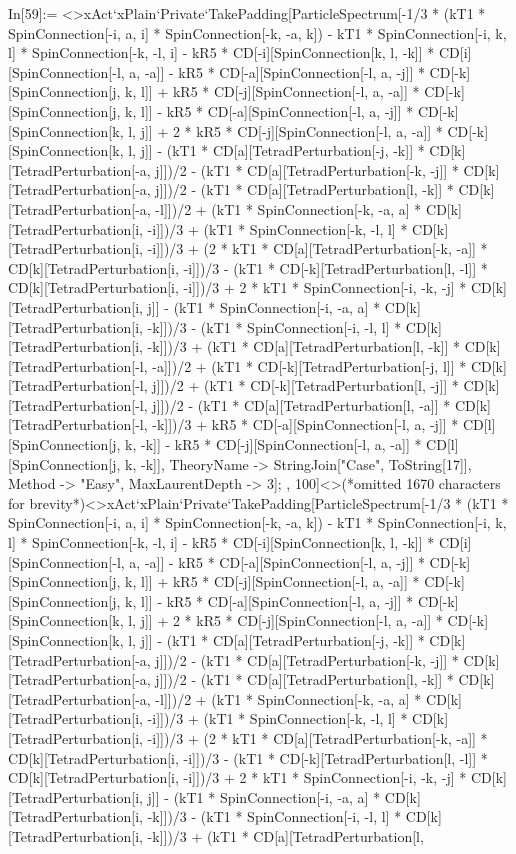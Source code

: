 In[59]:= <>xAct`xPlain`Private`TakePadding[ParticleSpectrum[-1/3 * (kT1 * SpinConnection[-i, a, i] * SpinConnection[-k, -a, k]) - kT1 * SpinConnection[-i, k, l] * SpinConnection[-k, -l, i] - kR5 * CD[-i][SpinConnection[k, l, -k]] * CD[i][SpinConnection[-l, a, -a]] - kR5 * CD[-a][SpinConnection[-l, a, -j]] * CD[-k][SpinConnection[j, k, l]] + kR5 * CD[-j][SpinConnection[-l, a, -a]] * CD[-k][SpinConnection[j, k, l]] - kR5 * CD[-a][SpinConnection[-l, a, -j]] * CD[-k][SpinConnection[k, l, j]] + 2 * kR5 * CD[-j][SpinConnection[-l, a, -a]] * CD[-k][SpinConnection[k, l, j]] - (kT1 * CD[a][TetradPerturbation[-j, -k]] * CD[k][TetradPerturbation[-a, j]])/2 - (kT1 * CD[a][TetradPerturbation[-k, -j]] * CD[k][TetradPerturbation[-a, j]])/2 - (kT1 * CD[a][TetradPerturbation[l, -k]] * CD[k][TetradPerturbation[-a, -l]])/2 + (kT1 * SpinConnection[-k, -a, a] * CD[k][TetradPerturbation[i, -i]])/3 + (kT1 * SpinConnection[-k, -l, l] * CD[k][TetradPerturbation[i, -i]])/3 + (2 * kT1 * CD[a][TetradPerturbation[-k, -a]] * CD[k][TetradPerturbation[i, -i]])/3 - (kT1 * CD[-k][TetradPerturbation[l, -l]] * CD[k][TetradPerturbation[i, -i]])/3 + 2 * kT1 * SpinConnection[-i, -k, -j] * CD[k][TetradPerturbation[i, j]] - (kT1 * SpinConnection[-i, -a, a] * CD[k][TetradPerturbation[i, -k]])/3 - (kT1 * SpinConnection[-i, -l, l] * CD[k][TetradPerturbation[i, -k]])/3 + (kT1 * CD[a][TetradPerturbation[l, -k]] * CD[k][TetradPerturbation[-l, -a]])/2 + (kT1 * CD[-k][TetradPerturbation[-j, l]] * CD[k][TetradPerturbation[-l, j]])/2 + (kT1 * CD[-k][TetradPerturbation[l, -j]] * CD[k][TetradPerturbation[-l, j]])/2 - (kT1 * CD[a][TetradPerturbation[l, -a]] * CD[k][TetradPerturbation[-l, -k]])/3 + kR5 * CD[-a][SpinConnection[-l, a, -j]] * CD[l][SpinConnection[j, k, -k]] - kR5 * CD[-j][SpinConnection[-l, a, -a]] * CD[l][SpinConnection[j, k, -k]], TheoryName -> StringJoin["Case", ToString[17]], Method -> "Easy", MaxLaurentDepth -> 3]; , 100]<>(*omitted 1670 characters for brevity*)<>xAct`xPlain`Private`TakePadding[ParticleSpectrum[-1/3 * (kT1 * SpinConnection[-i, a, i] * SpinConnection[-k, -a, k]) - kT1 * SpinConnection[-i, k, l] * SpinConnection[-k, -l, i] - kR5 * CD[-i][SpinConnection[k, l, -k]] * CD[i][SpinConnection[-l, a, -a]] - kR5 * CD[-a][SpinConnection[-l, a, -j]] * CD[-k][SpinConnection[j, k, l]] + kR5 * CD[-j][SpinConnection[-l, a, -a]] * CD[-k][SpinConnection[j, k, l]] - kR5 * CD[-a][SpinConnection[-l, a, -j]] * CD[-k][SpinConnection[k, l, j]] + 2 * kR5 * CD[-j][SpinConnection[-l, a, -a]] * CD[-k][SpinConnection[k, l, j]] - (kT1 * CD[a][TetradPerturbation[-j, -k]] * CD[k][TetradPerturbation[-a, j]])/2 - (kT1 * CD[a][TetradPerturbation[-k, -j]] * CD[k][TetradPerturbation[-a, j]])/2 - (kT1 * CD[a][TetradPerturbation[l, -k]] * CD[k][TetradPerturbation[-a, -l]])/2 + (kT1 * SpinConnection[-k, -a, a] * CD[k][TetradPerturbation[i, -i]])/3 + (kT1 * SpinConnection[-k, -l, l] * CD[k][TetradPerturbation[i, -i]])/3 + (2 * kT1 * CD[a][TetradPerturbation[-k, -a]] * CD[k][TetradPerturbation[i, -i]])/3 - (kT1 * CD[-k][TetradPerturbation[l, -l]] * CD[k][TetradPerturbation[i, -i]])/3 + 2 * kT1 * SpinConnection[-i, -k, -j] * CD[k][TetradPerturbation[i, j]] - (kT1 * SpinConnection[-i, -a, a] * CD[k][TetradPerturbation[i, -k]])/3 - (kT1 * SpinConnection[-i, -l, l] * CD[k][TetradPerturbation[i, -k]])/3 + (kT1 * CD[a][TetradPerturbation[l, 